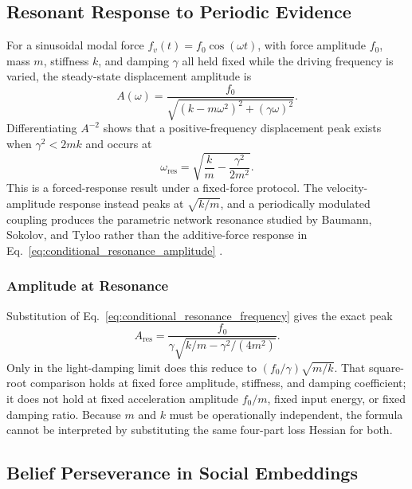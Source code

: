 \documentclass[12pt]{article}
\begin{document}
\subsection{Resonant Response to Periodic Evidence}

For a sinusoidal modal force $f_v(t)=f_0\cos(\omega t)$, with force amplitude $f_0$, mass $m$, stiffness $k$, and damping $\gamma$ all held fixed while the driving frequency is varied, the steady-state displacement amplitude is
\begin{equation}
A(\omega)=\frac{f_0}
{\sqrt{(k-m\omega^2)^2+(\gamma\omega)^2}}.
\label{eq:conditional_resonance_amplitude}
\end{equation}
Differentiating $A^{-2}$ shows that a positive-frequency displacement peak exists when $\gamma^2<2mk$ and occurs at
\begin{equation}
\boxed{
\omega_{\mathrm{res}}
=\sqrt{\frac{k}{m}-\frac{\gamma^2}{2m^2}}.}
\label{eq:conditional_resonance_frequency}
\end{equation}
This is a forced-response result under a fixed-force protocol.  The velocity-amplitude response instead peaks at $\sqrt{k/m}$, and a periodically modulated coupling produces the parametric network resonance studied by Baumann, Sokolov, and Tyloo rather than the additive-force response in Eq.~\eqref{eq:conditional_resonance_amplitude} \citep{BaumannSokolovTyloo2020}.


\subsubsection{Amplitude at Resonance}

Substitution of Eq.~\eqref{eq:conditional_resonance_frequency} gives the exact peak
\begin{equation}
\boxed{
A_{\mathrm{res}}
=\frac{f_0}{\gamma\sqrt{k/m-\gamma^2/(4m^2)}}.}
\label{eq:conditional_resonance_peak}
\end{equation}
Only in the light-damping limit does this reduce to $(f_0/\gamma)\sqrt{m/k}$.  That square-root comparison holds at fixed force amplitude, stiffness, and damping coefficient; it does not hold at fixed acceleration amplitude $f_0/m$, fixed input energy, or fixed damping ratio.  Because $m$ and $k$ must be operationally independent, the formula cannot be interpreted by substituting the same four-part loss Hessian for both.


\subsection{Belief Perseverance in Social Embeddings}
\end{document}
